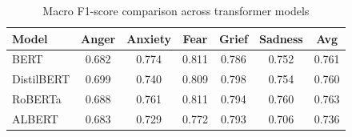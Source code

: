 
\begin{table}[h]
\centering
\caption{Macro F1-score comparison across transformer models}
\label{tab:model_comparison}
\begin{tabular}{lcccccc}
\hline
\textbf{Model} & \textbf{Anger} & \textbf{Anxiety} & \textbf{Fear} & \textbf{Grief} & \textbf{Sadness} & \textbf{Avg} \\
\hline
BERT & 0.682 & 0.774 & 0.811 & 0.786 & 0.752 & 0.761 \\
DistilBERT & 0.699 & 0.740 & 0.809 & 0.798 & 0.754 & 0.760 \\
RoBERTa & 0.688 & 0.761 & 0.811 & 0.794 & 0.760 & 0.763 \\
ALBERT & 0.683 & 0.729 & 0.772 & 0.793 & 0.706 & 0.736 \\

\hline
\end{tabular}
\end{table}
